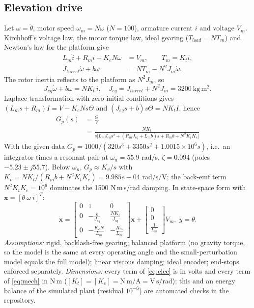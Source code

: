 \documentclass[conference]{IEEEtran}
\begin{document}
\subsection{Elevation drive}
Let $\omega=\dot\theta$, motor speed $\omega_m=N\omega$ ($N=100$), armature current $i$ and voltage $V_m$. Kirchhoff's voltage law, the motor torque law, ideal gearing ($T_{load}=NT_m$) and Newton's law for the platform give
\begin{align}
L_m\dot i + R_m i + K_eN\omega &= V_m, \qquad T_m=K_t i,\label{eq:elec}\\
J_{turret}\dot\omega + b\omega &= N T_m - N^2 J_m\dot\omega .\label{eq:mech}
\end{align}
The rotor inertia reflects to the platform as $N^2J_m$, so
\begin{equation}
J_{eq}\dot\omega + b\omega = NK_t\, i,\quad J_{eq}=J_{turret}+N^2J_m=3200~\mathrm{kg\,m^2}.\label{eq:jeq}
\end{equation}
Laplace transformation with zero initial conditions gives $(L_ms+R_m)I=V-K_eNs\Theta$ and $(J_{eq}s+b)s\Theta=NK_tI$, hence
\begin{equation}
\begin{split}G_p(s)&=\frac{\Theta}{V}\\&=\frac{NK_t}{s\big[L_mJ_{eq}s^2+(R_mJ_{eq}+L_mb)s+R_mb+N^2K_tK_e\big]}\end{split}\label{eq:gp}
\end{equation}
With the given data $G_p=1000/(320s^3+3350s^2+1.0015{\times}10^6s)$, i.e.\ an integrator times a resonant pair at $\omega_n=55.9$ rad/s, $\zeta=0.094$ (poles $-5.23\pm j55.7$). Below $\omega_n$, $G_p\approx K_v/s$ with $K_v=NK_t/(R_mb+N^2K_tK_e)=9.985e-04$ rad/s/V; the back-emf term $N^2K_tK_e=10^6$ dominates the 1500 N\,m\,s/rad damping. In state-space form with $\mathbf x=[\theta\ \omega\ i]^T$:
\begin{equation}
\dot{\mathbf x}=\begin{bmatrix}0&1&0\\0&-\tfrac{b}{J_{eq}}&\tfrac{NK_t}{J_{eq}}\\0&-\tfrac{K_eN}{L_m}&-\tfrac{R_m}{L_m}\end{bmatrix}\mathbf x+\begin{bmatrix}0\\0\\\tfrac1{L_m}\end{bmatrix}V_m,\; y=\theta .
\end{equation}
\textit{Assumptions:} rigid, backlash-free gearing; balanced platform (no gravity torque, so the model is the same at every operating angle and the small-perturbation model equals the full model); linear viscous damping; ideal encoder; end-stops enforced separately. \textit{Dimensions:} every term of \eqref{eq:elec} is in volts and every term of \eqref{eq:mech} in N\,m ($[K_t]=[K_e]=\mathrm{N\,m/A}=\mathrm{V\,s/rad}$); this and an energy balance of the simulated plant (residual $10^{-6}$) are automated checks in the repository.
\end{document}
